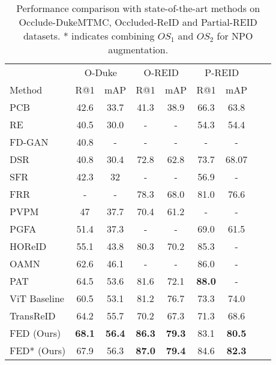 \documentclass[10pt,twocolumn,letterpaper]{article}
\begin{document}
\begin{table}[t]
	\centering
	\small
\setlength\tabcolsep{1pt}
	\begin{tabular}{ccccccccc}
	    \toprule
		\multicolumn{1}{c}{} & \multicolumn{2}{c}{O-Duke} & \multicolumn{2}{c}{O-REID} & \multicolumn{2}{c}{P-REID} \\
		\multicolumn{1}{l}{Method} & R@1 & mAP & R@1 & mAP & R@1 & mAP \\
		\hline
		\multicolumn{1}{l}{PCB \cite{sun2018beyond}} & 42.6 & 33.7 & 41.3 & 38.9 & 66.3 & 63.8 \\
		\multicolumn{1}{l}{RE \cite{zhong2020random}} & 40.5 & 30.0 & - & - & 54.3 & 54.4 \\
		\multicolumn{1}{l}{FD-GAN \cite{ge2018fd}} & 40.8 & - & - & - & - & - \\
		\multicolumn{1}{l}{DSR \cite{he2018deep}} & 40.8 & 30.4 & 72.8 & 62.8 & 73.7 & 68.07 \\
		\multicolumn{1}{l}{SFR \cite{he2018recognizing}} & 42.3 & 32 & - & - & 56.9 & - \\
		\multicolumn{1}{l}{FRR \cite{he2019foreground}} & - & - & 78.3 & 68.0 & 81.0 & 76.6 \\
		\multicolumn{1}{l}{PVPM \cite{gao2020pose}} & 47 & 37.7 & 70.4 & 61.2 & - & - \\
		\multicolumn{1}{l}{PGFA \cite{miao2019pose}} & 51.4 & 37.3 & - & - & 69.0 & 61.5 \\
		\multicolumn{1}{l}{HOReID \cite{wang2020high}} & 55.1 & 43.8 & 80.3 & 70.2 & 85.3 & - \\
		\multicolumn{1}{l}{OAMN \cite{chen2021occlude}} & 62.6 & 46.1 & - & - & 86.0 & - \\
		\multicolumn{1}{l}{PAT \cite{li2021diverse}} & 64.5 & 53.6 & 81.6 & 72.1 & \textbf{88.0} & - \\
		\hline
		\multicolumn{1}{l}{ViT Baseline \cite{he2021transreid}} & 60.5 & 53.1 & 81.2 & 76.7 & 73.3 & 74.0 \\
		\multicolumn{1}{l}{TransReID \cite{he2021transreid}} & 64.2 & 55.7 & 70.2 & 67.3 & 71.3 & 68.6 \\
		\hline
		\multicolumn{1}{l}{FED (Ours)} & \textbf{68.1} & \textbf{56.4} & \textbf{86.3} & \textbf{79.3} & 83.1 & \textbf{80.5}\\
		\multicolumn{1}{l}{FED* (Ours)} & 67.9 & 56.3 & \textbf{87.0} & \textbf{79.4} & 84.6 & \textbf{82.3}\\
		\bottomrule
	\end{tabular}
\caption{Performance comparison with state-of-the-art methods on Occlude-DukeMTMC, Occluded-ReID and Partial-REID datasets. * indicates combining $OS_1$ and $OS_2$ for NPO augmentation. 
	}
	\label{occluded}
\end{table}
\end{document}
